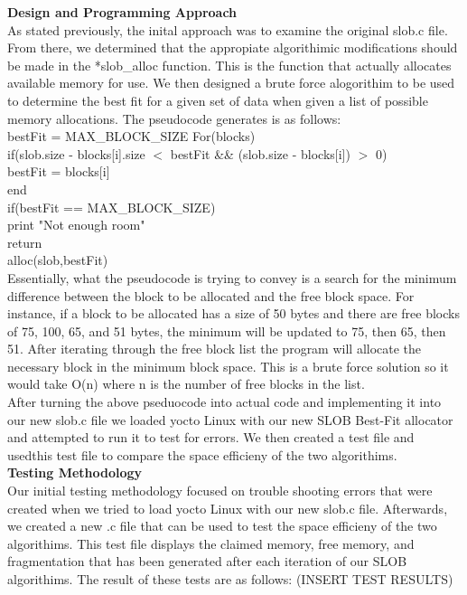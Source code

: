 \documentclass[letterpaper,10pt,draftclsnofoot,titlepage,onecolumn]{IEEEtran}
\begin{document}
		
	\textbf{Design and Programming Approach}\\

	As stated previously, the inital approach was to examine the original slob.c file. From there, we determined that the appropiate algorithimic modifications should be made in the *slob\_alloc function. This is the function that actually allocates available memory for use. We then designed a brute force alogorithim to be used to determine the best fit for a given set of data when given a list of possible memory allocations. The pseudocode generates is as follows: \\
	
	bestFit = MAX\_BLOCK\_SIZE
	For(blocks) \\
		if(slob.size - blocks[i].size $<$ bestFit \&\& (slob.size - blocks[i]) $>$ 0)\\
			bestFit = blocks[i] \\
	end \\

	if(bestFit == MAX\_BLOCK\_SIZE) \\
		print "Not enough room"	\\
		return \\
	alloc(slob,bestFit)\\
	
	Essentially, what the pseudocode is trying to convey is a search for the minimum difference between the block to be allocated and the free block space. For instance, if a block to be allocated has a size of 50 bytes and there are free blocks of 75, 100, 65, and 51 bytes, the minimum will be updated to 75, then 65, then 51. After iterating through the free block list the program will allocate the necessary block in the minimum block space. This is a brute force solution so it would take O(n) where n is the number of free blocks in the list.\\
	After turning the above pseduocode into actual code and implementing it into our new slob.c file we loaded yocto Linux with our new SLOB Best-Fit allocator and attempted to run it to test for errors. We then created a test file and usedthis test file to compare the space efficieny of the two algorithims.\\ 
 
	\textbf{Testing Methodology}\\
	
	Our initial testing methodology focused on trouble shooting errors that were created when we tried to load yocto Linux with our new slob.c file. Afterwards, we created a new .c file that can be used to test the space efficieny of the two algorithims. This test file displays the claimed memory, free memory, and fragmentation that has been generated after each iteration of our SLOB algorithims. The result of these tests are as follows: (INSERT TEST RESULTS)\\
\end{document}
